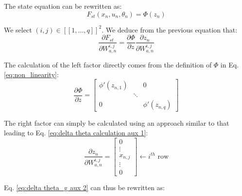 \documentclass[twocolumn,a4paper]{svjour3} \sloppy          \smartqed
\begin{document}
The state equation can be rewritten as:
\begin{equation} \label{eq:state equation rewritten}
F_{st}(x_n, u_n, \theta_n) = \Phi(z_n)
\end{equation}

We select $(i,j) \in [\![ 1, ..., q ]\!]^2$. We deduce from the previous equation that:
\begin{equation} \label{eq:delta theta_g aux 2}
\frac{\partial F_{st}}{\partial W_{a,n}^{i,j}} = \frac{\partial \Phi}{\partial z} \frac{\partial z_n}{\partial W_{a,n}^{i,j}}
\end{equation} 

The calculation of the left factor directly comes from the definition of $\Phi$ in Eq. \ref{eq:non_linearity}:
\begin{equation} \label{eq:partial Phi over partial z}
\frac{\partial \Phi}{\partial z} = 
\begin{bmatrix}
   \phi'(z_{n,1}) & & 0\\ 
   & \ddots & \\
  0 &  &  \phi'(z_{n,q}) 
 \end{bmatrix}
\end{equation}

The right factor can simply be calculated using an approach similar to that leading to Eq. \ref{eq:delta theta calculation aux 1}:
\begin{equation}
\frac{\partial z_n}{\partial W_{a,n}^{i,j}} = \begin{bmatrix} 
0 \\
\vdots \\
x_{n,j} \\
\vdots \\
0
\end{bmatrix}
\leftarrow i^{th} \mbox{ row}
\end{equation}

Eq. \ref{eq:delta theta_g aux 2} can thus be rewritten as:
\end{document}
